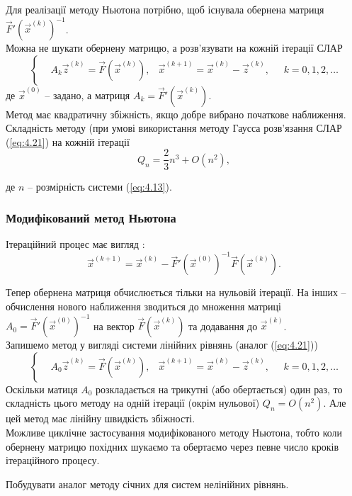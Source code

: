 Для реалізації методу Ньютона потрібно, щоб існувала обернена матриця $\vec F'(\vec x^{(k)})^{-1}$. \\

Можна не шукати обернену матрицю, а розв’язувати на кожній ітерації СЛАР
\begin{equation}
	\label{eq:4.21}
	\left\{
		\begin{aligned}
			& A_k \vec z^{(k)} =\vec F(\vec x^{(k)}),
			& \vec x^{(k + 1)} = \vec x^{(k)} - \vec z^{(k)},
		\end{aligned}
		\quad k=0,1,2,\ldots
	\right.
\end{equation}
де $\vec x^{(0)}$ -- задано, а матриця $A_k = \vec F'(\vec x^{(k)})$. \\

Метод має квадратичну збіжність, якщо добре вибрано початкове наближення. Складність методу (при умові використання методу Гаусса розв'язання СЛАР (\ref{eq:4.21}) на кожній ітерації \[Q_n = \dfrac23 n^3+O(n^2),\]

де $n$ -- розмірність системи (\ref{eq:4.13}).

\subsubsection{Модифікований метод Ньютона}

Ітераційний процес має вигляд :
\[ \vec x^{(k+1)} = \vec x^{(k)} - \vec F'(\vec x^{(0)})^{-1} \vec F(\vec x^{(k)}). \]

Тепер обернена матриця обчислюється тільки на нульовій ітерації. На інших -- обчислення нового наближення зводиться до множення матриці $A_0 = \vec F'(\vec x^{(0)})^{-1}$ на вектор $\vec F(\vec x^{(k)})$ та додавання до $\vec x^{(k)}$. \\

Запишемо метод у вигляді системи лінійних рівнянь (аналог (\ref{eq:4.21}))
\begin{equation}
	\label{eq:4.22}
	\left\{
		\begin{aligned}
			& A_0 \vec z^{(k)} =\vec F(\vec x^{(k)}),
			& \vec x^{(k + 1)} = \vec x^{(k)} - \vec z^{(k)},
		\end{aligned}
		\quad k=0,1,2,\ldots
	\right.
\end{equation}
Оскільки матиця $A_0$ розкладається на трикутні (або обертається) один раз, то складність цього методу на одній ітерації (окрім нульової) $Q_n = O(n^2)$. Але цей метод має лінійну швидкість збіжності. \\

Можливе циклічне застосування модифікованого методу Ньютона, тобто коли обернену матрицю похідних шукаємо та обертаємо через певне число кроків ітераційного процесу. \\

\begin{problem}
	Побудувати аналог методу січних для систем нелінійних рівнянь.
\end{problem}